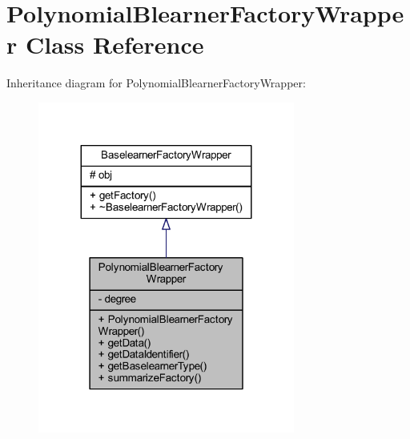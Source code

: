 \hypertarget{class_polynomial_blearner_factory_wrapper}{}\section{Polynomial\+Blearner\+Factory\+Wrapper Class Reference}
\label{class_polynomial_blearner_factory_wrapper}


Inheritance diagram for Polynomial\+Blearner\+Factory\+Wrapper\+:\nopagebreak
\begin{figure}[H]
\begin{center}
\leavevmode
\includegraphics[width=239pt]{class_polynomial_blearner_factory_wrapper__inherit__graph}
\end{center}
\end{figure}


